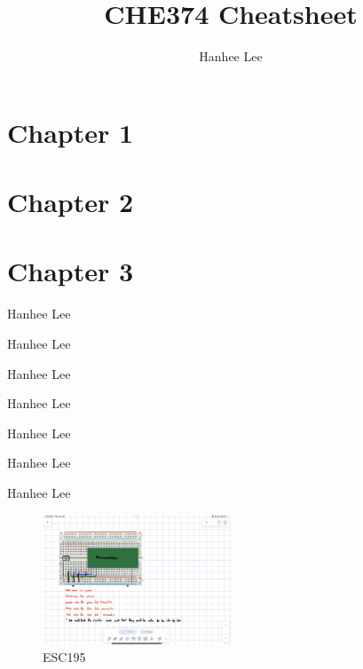\documentclass{article}
\title{CHE374 Cheatsheet}
\author{Hanhee Lee}
\begin{document}
    \maketitle
    \tableofcontents
    \section{Chapter 1}
    \section{Chapter 2}
    \section{Chapter 3}

\begin{process}
    Hanhee Lee
\end{process}

\begin{example}
    Hanhee Lee
\end{example}

\begin{definition}
    Hanhee Lee 
\end{definition}

\begin{theorem}
    Hanhee Lee
\end{theorem}

\begin{derivation}
    Hanhee Lee
\end{derivation}

\begin{intuition}
    Hanhee Lee
\end{intuition}

\begin{warning}
    Hanhee Lee
\end{warning}

\begin{figure}[H]
    \centering
    \includegraphics[width=0.5\textwidth]{00_Images/diagram_circuit.png}
    \caption{ESC195}
\end{figure}
\end{document}
